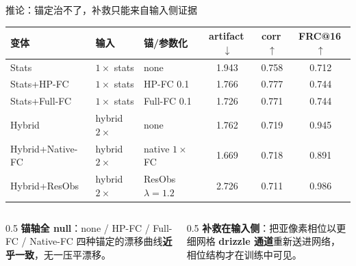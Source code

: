 \begin{frame}{推论：锚定治不了，补救只能来自输入侧证据}
  \footnotesize
  \begin{center}
  \begin{tabular}{@{}lllccc@{}}
    \toprule
    变体 & 输入 & 锚/参数化 & artifact\,$\downarrow$ & corr\,$\uparrow$ & FRC@16\,$\uparrow$ \\
    \midrule
    Stats            & $1\times$ stats   & none            & 1.943 & 0.758 & 0.712 \\
    Stats+HP-FC      & $1\times$ stats   & HP-FC 0.1       & 1.766 & 0.777 & 0.744 \\
    Stats+Full-FC    & $1\times$ stats   & Full-FC 0.1     & 1.726 & 0.771 & 0.744 \\
    \midrule
    Hybrid           & hybrid $2\times$  & none            & 1.762 & 0.719 & 0.945 \\
    Hybrid+Native-FC & hybrid $2\times$  & native $1\times$ FC & 1.669 & 0.718 & 0.891 \\
    Hybrid+ResObs    & hybrid $2\times$  & ResObs $\lambda{=}1.2$ & 2.726 & 0.711 & 0.986 \\
    \bottomrule
  \end{tabular}
  \end{center}
  \begin{columns}[T]
    \begin{column}{0.5\textwidth}
      \footnotesize
      \textbf{锚轴全 null}：none / HP-FC / Full-FC / Native-FC
      四种锚定的漂移曲线\textbf{近乎一致}，无一压平漂移。
    \end{column}
    \begin{column}{0.5\textwidth}
      \footnotesize
      \textbf{补救在输入侧}：把亚像素相位以更细网格 \textbf{drizzle 通道}重新送进网络，
      相位结构才在训练中可见。
    \end{column}
  \end{columns}
\end{frame}
